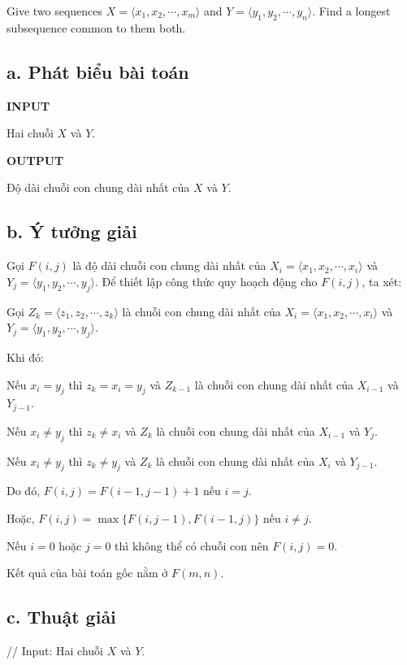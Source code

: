 \documentclass[12pt, a4paper, fleqn]{article}
\begin{document}
	Give two sequences $X = \langle x_1, x_2, \cdots, x_m \rangle$ and $Y = \langle y_1, y_2, \cdots, y_n \rangle$. Find a longest subsequence common to them both.

	\subsection*{a. Phát biểu bài toán}
	
	\textbf{INPUT}

	Hai chuỗi $X$ và $Y$.

	\textbf{OUTPUT}

	Độ dài chuỗi con chung dài nhất của $X$ và $Y$.

	\subsection*{b. Ý tưởng giải}
	
	Gọi $F(i, j)$ là độ dài chuỗi con chung dài nhất của $X_i = \langle x_1, x_2, \cdots, x_i \rangle$ và $Y_j = \langle y_1, y_2, \cdots, y_j \rangle$. Để thiết lập công thức quy hoạch động cho $F(i, j)$, ta xét:
	
	Gọi $Z_k = \langle z_1, z_2, \cdots, z_k \rangle$ là chuỗi con chung dài nhất của $X_i = \langle x_1, x_2, \cdots, x_i \rangle$ và $Y_j = \langle y_1, y_2, \cdots, y_j \rangle$.
	
	Khi đó:
	
	Nếu $x_i = y_j$ thì $z_k = x_i = y_j$ và $Z_{k - 1}$ là chuỗi con chung dài nhất của $X_{i - 1}$ và $Y_{j - 1}$.
	
	Nếu $x_i \neq y_j$ thì $z_k \neq x_i$ và $Z_k$ là chuỗi con chung dài nhất của $X_{i - 1}$ và $Y_j$.
	
	Nếu $x_i \neq y_j$ thì $z_k \neq y_j$ và $Z_k$ là chuỗi con chung dài nhất của $X_i$ và $Y_{j - 1}$.
	
	Do đó, $F(i, j) = F(i - 1, j - 1) + 1$ nếu $i = j$.
	
	Hoặc, $F(i, j) = \max\{F(i, j - 1), F(i - 1, j)\}$ nếu $i \neq j$.
	
	Nếu $i = 0$ hoặc $j = 0$ thì không thể có chuỗi con nên $F(i ,j) = 0$.
	
	Kết quả của bài toán gốc nằm ở $F(m, n)$.

	\subsection*{c. Thuật giải}
	
	// Input: Hai chuỗi $X$ và $Y$.
	
\end{document}
